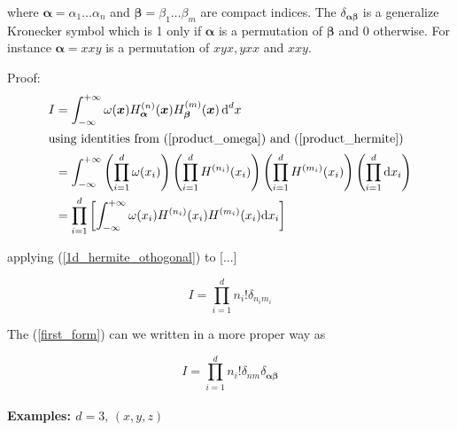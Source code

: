 \documentclass[draft]{article}
\begin{document}
where $\bm{\alpha} = \alpha_1 \dots \alpha_n$ and $\bm{\beta} = \beta_1 \dots \beta_m$ are compact indices. The $\delta_{\bm{\alpha} \bm{\beta}}$ is a generalize Kronecker symbol which is 1 only if $\bm{\alpha}$ is a permutation of $\bm{\beta}$ and 0 otherwise. For instance $\bm{\alpha} = xxy$ is a permutation of $xyx, yxx$ and $xxy$. 

\vspace*{0.5cm}
Proof:
\begin{align*}
	I &= \int_{-\infty}^{+\infty} \omega(\bm{x}) H^{(n)}_{\bm{\alpha}}(\bm{x}) H^{(m)}_{\bm{\beta}}(\bm{x}) \, \text{d}^d x \\
	\intertext{using identities from (\ref{product_omega}) and (\ref{product_hermite})}
	  &= \int_{-\infty}^{+\infty} \left ( \prod_{i=1}^{d} \omega(x_i) \right ) \left ( \prod_{i=1}^{d} H^{(n_i)}(x_i) \right ) \left ( \prod_{i=1}^{d} H^{(m_i)}(x_i) \right ) \left ( \prod_{i=1}^{d} \text{d}x_i \right ) \\
	  &= \prod_{i=1}^{d} \left [ \int_{-\infty}^{+\infty} \omega(x_i)H^{(n_i)}(x_i)H^{(m_i)}(x_i)\text{d}x_i \right ]
\end{align*}

applying (\ref{1d_hermite_othogonal}) to [...]

\begin{equation}
	I = \prod_{i=1}^{d} n_i! \delta_{n_im_i} \label{first_form}
\end{equation}

The (\ref{first_form}) can we written in a more proper way as

\begin{equation}
	I = \prod_{i=1}^{d} n_i! \delta_{nm} \delta_{\bm{\alpha} \bm{\beta}} \label{second_form}
\end{equation}

\clearpage

\paragraph*{Examples: $d=3, \, (x,y,z)$}
\end{document}
